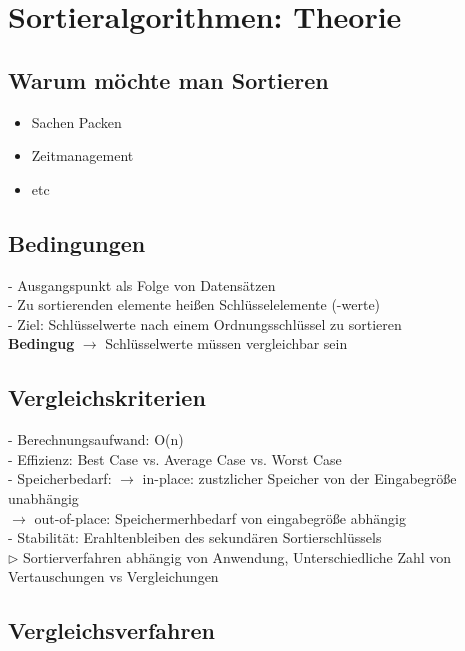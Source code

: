 \vspace{1.5cm}
\section{Sortieralgorithmen: Theorie} %

	\subsection{Warum möchte man Sortieren}
	\begin{itemize}
		\item Sachen Packen
		\item Zeitmanagement
		\item etc
	\end{itemize}

	\subsection{Bedingungen}
	- Ausgangspunkt als Folge von Datensätzen \\
	- Zu sortierenden elemente hei\ss en Schlüsselelemente (-werte) \\
	- Ziel: Schlüsselwerte nach einem Ordnungsschlüssel zu sortieren \\
	\textbf{Bedingug} $\rightarrow$ Schlüsselwerte müssen vergleichbar sein

	\subsection{Vergleichskriterien}
	- Berechnungsaufwand: O(n) \\
	- Effizienz: Best Case vs. Average Case vs. Worst Case \\ 
	- Speicherbedarf:
	$\rightarrow$ in-place: zustzlicher Speicher von der Eingabegrö\ss e unabhängig \\
	$\rightarrow$ out-of-place: Speichermerhbedarf von eingabegrö\ss e abhängig \\
	- Stabilität: Erahltenbleiben des sekundären Sortierschlüssels \\

	$\rhd$ Sortierverfahren abhängig von Anwendung, Unterschiedliche Zahl von Vertauschungen vs Vergleichungen 

	\subsection{Vergleichsverfahren}

